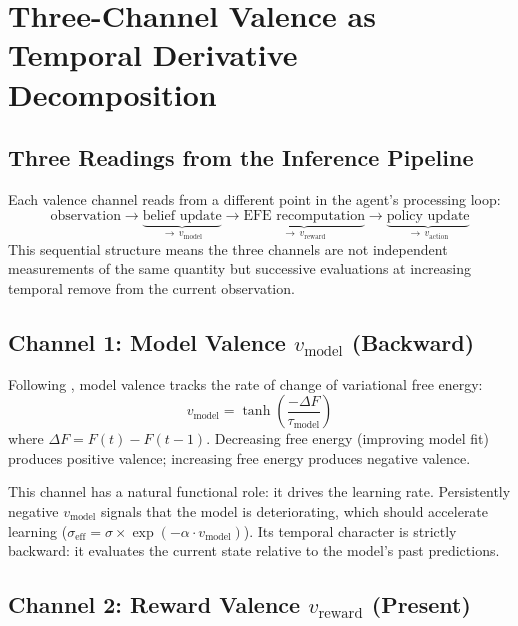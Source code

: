 \documentclass[11pt,a4paper]{article}
\begin{document}
\section{Three-Channel Valence as Temporal Derivative Decomposition}\label{sec:three_channel}

\subsection{Three Readings from the Inference Pipeline}\label{sec:pipeline}

Each valence channel reads from a different point in the agent's processing loop:
\begin{equation}
    \text{observation} \to \underbrace{\text{belief update}}_{\to\, v_{\text{model}}} \to \underbrace{\text{EFE recomputation}}_{\to\, v_{\text{reward}}} \to \underbrace{\text{policy update}}_{\to\, v_{\text{action}}}
\end{equation}
This sequential structure means the three channels are not independent measurements of the same quantity but successive evaluations at increasing temporal remove from the current observation.

\subsection{Channel 1: Model Valence $v_{\text{model}}$ (Backward)}\label{sec:v_model}

Following \citet{joffily2013emotional}, model valence tracks the rate of change of variational free energy:
\begin{equation}
    v_{\text{model}} = \tanh\!\left(\frac{-\Delta F}{\tau_{\text{model}}}\right)
\end{equation}
where $\Delta F = F(t) - F(t{-}1)$. Decreasing free energy (improving model fit) produces positive valence; increasing free energy produces negative valence.

This channel has a natural functional role: it drives the learning rate. Persistently negative $v_{\text{model}}$ signals that the model is deteriorating, which should accelerate learning ($\sigma_{\text{eff}} = \sigma \times \exp(-\alpha \cdot v_{\text{model}})$). Its temporal character is strictly backward: it evaluates the current state relative to the model's past predictions.

\subsection{Channel 2: Reward Valence $v_{\text{reward}}$ (Present)}\label{sec:v_reward}
\end{document}
